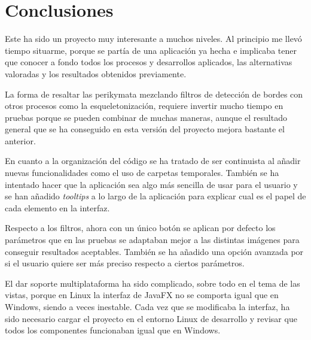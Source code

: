 
\begin{comment}
Todo proyecto debe incluir las conclusiones que se derivan de su desarrollo. Éstas pueden ser de diferente índole, dependiendo de la tipología del proyecto, pero normalmente van a estar presentes un conjunto de conclusiones relacionadas con los resultados del proyecto y un conjunto de conclusiones técnicas. 
Además, resulta muy útil realizar un informe crítico indicando cómo se puede mejorar el proyecto, o cómo se puede continuar trabajando en la línea del proyecto realizado. 
\end{comment}

\section{Conclusiones}

Este ha sido un proyecto muy interesante a muchos niveles. Al principio me llevó tiempo situarme, porque se partía de una aplicación ya hecha e implicaba tener que conocer a fondo todos los procesos y desarrollos aplicados, las alternativas valoradas y los resultados obtenidos previamente.

La forma de resaltar las perikymata mezclando filtros de detección de bordes con otros procesos como la esqueletonización, requiere invertir mucho tiempo en pruebas porque se pueden combinar de muchas maneras, aunque el resultado general que se ha conseguido en esta versión del proyecto mejora bastante el anterior.

En cuanto a la organización del código se ha tratado de ser continuista al añadir nuevas funcionalidades como el uso de carpetas temporales. También se ha intentado hacer que la aplicación sea algo más sencilla de usar para el usuario y se han añadido \textit{tooltips} a lo largo de la aplicación para explicar cual es el papel de cada elemento en la interfaz.

Respecto a los filtros, ahora con un único botón se aplican por defecto los parámetros que en las pruebas se adaptaban mejor a las distintas imágenes para conseguir resultados aceptables. También se ha añadido una opción avanzada por si el usuario quiere ser más preciso respecto a ciertos parámetros.

El dar soporte multiplataforma ha sido complicado, sobre todo en el tema de las vistas, porque en Linux la interfaz de JavaFX no se comporta igual que en Windows, siendo a veces inestable. Cada vez que se modificaba la interfaz, ha sido necesario cargar el proyecto en el entorno Linux de desarrollo y revisar que todos los componentes funcionaban igual que en Windows.

